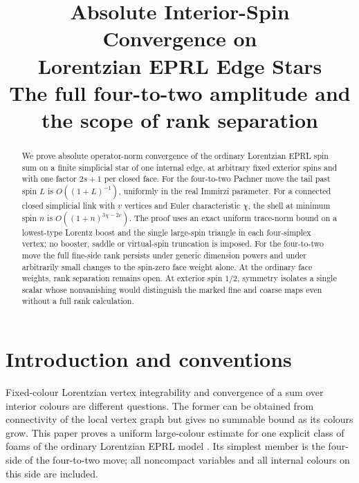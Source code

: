 \documentclass[11pt]{article}
\title{Absolute Interior-Spin Convergence on\\Lorentzian EPRL Edge Stars\\[3pt]
\large The full four-to-two amplitude and the scope of rank separation}
\author{}
\date{}
\theoremstyle{remark}
\begin{document}
\maketitle

\begin{abstract}
We prove absolute operator-norm convergence of the ordinary Lorentzian EPRL spin sum on a finite simplicial star of one internal edge, at arbitrary fixed exterior spins and with one factor \(2s+1\) per closed face. For the four-to-two Pachner move the tail past spin \(L\) is \(O((1+L)^{-1})\), uniformly in the real Immirzi parameter. For a connected closed simplicial link with \(v\) vertices and Euler characteristic \(\chi\), the shell at minimum spin \(n\) is \(O((1+n)^{3\chi-2v})\). The proof uses an exact uniform trace-norm bound on a lowest-type Lorentz boost and the single large-spin triangle in each four-simplex vertex; no booster, saddle or virtual-spin truncation is imposed. For the four-to-two move the full fine-side rank persists under generic dimension powers and under arbitrarily small changes to the spin-zero face weight alone. At the ordinary face weights, rank separation remains open. At exterior spin \(1/2\), symmetry isolates a single scalar whose nonvanishing would distinguish the marked fine and coarse maps even without a full rank calculation.
\end{abstract}

\section{Introduction and conventions}
Fixed-colour Lorentzian vertex integrability and convergence of a sum over interior colours are different questions. The former can be obtained from connectivity of the local vertex graph \cite{EP,Kaminski} but gives no summable bound as its colours grow. This paper proves a uniform large-colour estimate for one explicit class of foams of the ordinary Lorentzian EPRL model \cite{EPRL,Barrett}. Its simplest member is the four-side of the four-to-two move; all noncompact variables and all internal colours on this side are included.
\end{document}

